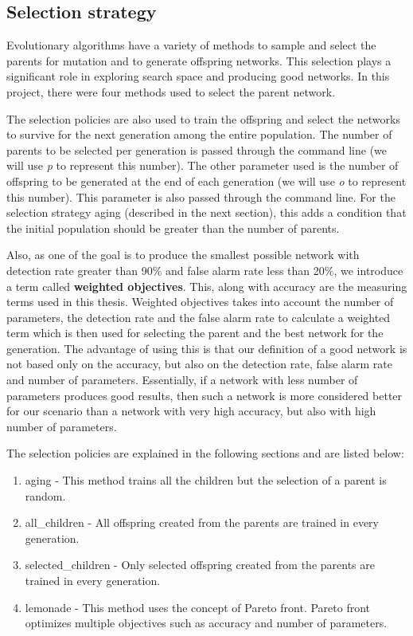 \clearpage

\subsection{Selection strategy}
\label{sec:selection_strategy}

Evolutionary algorithms have a variety of methods to sample and select the parents for mutation and to generate offspring networks. This selection plays a significant role in exploring search space and producing good networks. In this project, there were four methods used to select the parent network. 

The selection policies are also used to train the offspring and select the networks to survive for the next generation among the entire population. The number of parents to be selected per generation is passed through the command line (we will use \textit{p} to represent this number). The other parameter used is the number of offspring to be generated at the end of each generation (we will use \textit{o} to represent this number). This parameter is also passed through the command line. For the selection strategy aging (described in the next section), this adds a condition that the initial population should be greater than the number of parents. 

Also, as one of the goal is to produce the smallest possible network with detection rate greater than 90\% and false alarm rate less than 20\%, we introduce a term called \textbf{weighted objectives}. This, along with accuracy are the measuring terms used in this thesis. Weighted objectives takes into account the number of parameters, the detection rate and the false alarm rate to calculate a weighted term which is then used for selecting the parent and the best network for the generation. The advantage of using this is that our definition of a good network is not based only on the accuracy, but also on the detection rate, false alarm rate and number of parameters. Essentially, if a network with less number of parameters produces good results, then such a network is more considered better for our scenario than a network with very high accuracy, but also with high number of parameters. 

The selection policies are explained in the following sections and are listed below:

\begin{enumerate}
    \item aging - This method trains all the children but the selection of a parent is random.
     \item all\_children - All offspring created from the parents are trained in every generation.
    \item selected\_children - Only selected offspring created from the parents are trained in every generation.
    \item lemonade - This method uses the concept of Pareto front. Pareto front optimizes multiple objectives such as accuracy and number of parameters.
\end{enumerate}

